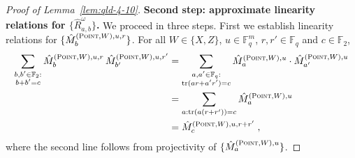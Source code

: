 \documentclass[11pt]{article}
\theoremstyle{definition}
\newcommand{\F}{\ensuremath{\mathbb{F}}}
\DeclareMathOperator{\tr}{tr}
\newcommand{\typestyle}[1]{\ensuremath{\textsc{#1}}\xspace}
\newcommand{\Point}{\typestyle{Point}}
\begin{document}
\begin{proof}[Proof of Lemma~\ref{lem:qld-4-10}]
	\textbf{Second step: approximate linearity relations for $\{ \hat{R}^\omega_{a,b} \}$.}
	We proceed in three steps. First we establish linearity relations for $\{ \hat{M}^{(\Point,W),u,r}_b \}$. For all $W \in \{X,Z\}$, $u \in \F_q^m$, $r, r' \in \F_q$ and $c \in \F_2$, 
	\begin{align}
		\sum_{\substack{b,b' \in \F_2 : \\ b + b' = c }} \hat{M}^{(\Point,W),u,r}_b \, \hat{M}^{(\Point,W),u,r'}_{b'} &= \sum_{\substack{a,a' \in \F_q: \\ \tr(ar + a'r') = c}} \hat{M}^{(\Point,W),u}_a \cdot \hat{M}^{(\Point,W),u}_{a'} \notag\\
		&= \sum_{a : \tr(a (r +r')) = c } \hat{M}^{(\Point,W),u}_a \notag\\
		&= \hat{M}^{(\Point,W),u,r+r'}_c\;,\label{eq:m-lin}
	\end{align}
	where the second line follows from projectivity of $\{\hat{M}^{(\Point,W),u}_a\}$. 
	

\end{proof}
\end{document}
